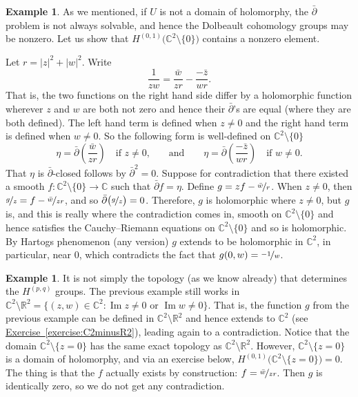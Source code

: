 \documentclass[12pt,openany]{book}
\renewcommand{\Im}{\operatorname{Im}}
\newcommand{\sabs}[1]{\lvert {#1} \rvert}
\newcommand{\C}{{\mathbb{C}}}
\newcommand{\R}{{\mathbb{R}}}
\theoremstyle{plain}
\theoremstyle{remark}
\theoremstyle{definition}
\theoremstyle{exercise}
\theoremstyle{example}
\newtheorem{example}[thm]{Example}
\newcommand{\exerciseref}[1]{\hyperref[#1]{Exercise~\ref*{#1}}}
\begin{document}
\begin{example}
As we mentioned, if $U$ is not a domain of holomorphy, the $\bar{\partial}$
problem is not always solvable, and hence the Dolbeault cohomology groups
may be nonzero.  Let us show that
$H^{(0,1)}\bigl(\C^2 \setminus \{ 0 \}\bigr)$ contains a nonzero element.

Let $r = \sabs{z}^2+\sabs{w}^2$.  Write
\begin{equation*}
\frac{1}{zw} = \frac{\bar{w}}{z r} - \frac{-\bar{z}}{w r} .
\end{equation*}
That is, the two functions on the right hand side differ by a holomorphic
function wherever $z$ and $w$ are both not zero and hence their
$\bar{\partial}$'s are equal (where they are both defined).  The left hand
term is defined when $z\not=0$ and the right hand term is defined when $w
\not=0$.  So the following form is well-defined on $\C^2 \setminus \{ 0 \}$
\begin{equation*}
\eta =
\bar{\partial}
\left(
\dfrac{\bar{w}}{z r}
\right)
\quad \text{if $z\not=0$,}
\qquad \text{and} \qquad
\eta =
\bar{\partial}
\left(
\dfrac{-\bar{z}}{w r}
\right)
\quad \text{if $w\not=0$} .
\end{equation*}
That $\eta$ is $\bar{\partial}$-closed follows by $\bar{\partial}^2 = 0$.
Suppose for contradiction that there existed a smooth
$f \colon \C^2 \setminus \{ 0 \} \to \C$
such that $\bar{\partial} f = \eta$.
Define $g = z f - \nicefrac{\bar{w}}{r}$.  When $z\not=0$, then
$\nicefrac{g}{z} = f - \nicefrac{\bar{w}}{zr}$, and so
$\bar{\partial}\bigl(\nicefrac{g}{z}\bigr) = 0$.  Therefore, $g$ is holomorphic
where $z\not=0$, but $g$ is, and this is really where the contradiction
comes in, smooth on $\C^2 \setminus \{ 0 \}$ and hence satisfies the
Cauchy--Riemann equations on $\C^2 \setminus \{ 0 \}$ and so is holomorphic.
By Hartogs phenomenon (any version) $g$ extends to be holomorphic in $\C^2$,
in particular, near $0$, which contradicts the fact that $g(0,w) =
\nicefrac{-1}{w}$.
\end{example}

\begin{example}
It is not simply the topology (as we know already) that determines the
$H^{(p,q)}$ groups.  The previous example still works in $\C^2 \setminus
\R^2 = \bigl\{ (z,w) \in \C^2 :
\Im z \not= 0 \text{ or } \Im w \not= 0 \bigr\}$.
That is, the function $g$ from the previous example can be defined in
$\C^2 \setminus \R^2$ and hence extends to $\C^2$
(see \exerciseref{exercise:C2minusR2}),
leading again to a contradiction.
Notice that the domain
$\C^2 \setminus \{ z = 0\}$
has the same exact topology as $\C^2 \setminus \R^2$.
However,
$\C^2 \setminus \{ z = 0\}$
is a domain of holomorphy, and via an exercise below,
$H^{(0,1)}\bigl(\C^2 \setminus \{ z = 0\}\bigr) = 0$.
The thing is that the $f$ actually exists
by construction: $f = \nicefrac{\bar{w}}{z r}$.  Then $g$ is identically
zero, so we do not get any contradiction.
\end{example}
\end{document}
